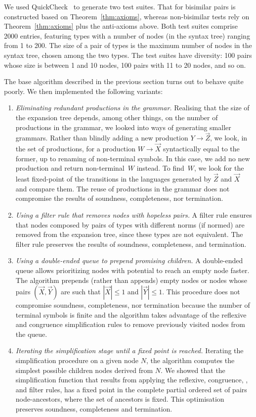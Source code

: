 We used QuickCheck~\cite{DBLP:conf/icfp/ClaessenH00} to generate two test
suites. That for bisimilar pairs is constructed based on
Theorem~\ref{thm:axioms}, whereas non-bisimilar tests
rely on Theorem~\ref{thm:axioms} plus the anti-axioms above. Both test suites
comprise 2000 entries, featuring types with
a number of nodes (in the syntax tree) ranging from 1 to 200.
The size of a pair of types is the maximum number of nodes in the syntax tree,
chosen among the two types. The test suites have diversity: 100 pairs whose
size is between 1 and 10 nodes, 100 pairs with 11 to 20 nodes, and so on.

The base algorithm described in the previous section turns out to
behave quite poorly. We then implemented the
following variants:
%
\begin{enumerate}
\item \emph{Eliminating redundant productions in the grammar.}
  Realising that the size of the expansion tree depends, among other
  things, on the number of productions in the grammar, we looked into
  ways of generating smaller grammars. Rather than blindly adding a
  new production $Y \rightarrow \vec Z$, we look, in the set of
  productions, for a production $W \rightarrow \vec X$ 
  syntactically equal to the former, up to renaming of non-terminal
  symbols.
  In this case, we add no new production and return
  non-terminal~$W$ instead. To find~$W$, we look for the least
  fixed-point of the transitions in the languages generated by
  $\vec Z$ and $\vec X$ and compare them.
  The reuse of productions in the grammar does not compromise the results 
  of soundness, completeness, nor termination.
  \item
  \emph{Using a filter rule that removes nodes with hopeless pairs.} A
  filter rule ensures that nodes composed by pairs of types with
  different norms (if normed) are removed from the expansion tree,
  since these types are not equivalent.  
  The filter rule
  preserves the results of soundness, completeness, and termination.
  \item
  \emph{Using a double-ended queue to prepend promising children.} A
  double-ended queue allows prioritizing nodes with potential to reach
  an empty node faster.  The algorithm prepends (rather than appends)
  empty nodes or nodes whose pairs $(\vec X, \vec Y)$ are such that
  $|\vec X|\leq 1$ and $|\vec Y| \leq 1$.
  This procedure does not compromise soundness, completeness, nor
  termination because the number of terminal symbols is finite and the 
  algorithm takes advantage of the reflexive and congruence simplification
  rules to remove previously visited nodes from the queue.
  \item
  \emph{Iterating the simplification stage until a fixed point is
    reached.} Iterating the simplification procedure on a given node
  $N$, the algorithm computes the simplest possible children nodes
  derived from $N$. We showed that the simplification function that
  results from applying the reflexive, congruence, \BPA, and filter
  rules, has a fixed point in the complete partial ordered set of
  pairs node-ancestors, where the set of ancestors is fixed.
  This optimisation preserves soundness, completeness and termination.
\end{enumerate}

